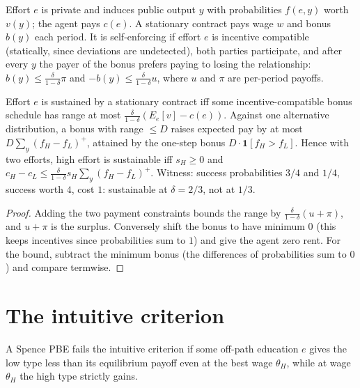\begin{definition}
\label{def:stat-contract}
\leanok
Effort $e$ is private and induces public output $y$ with probabilities $f(e, y)$ worth $v(y)$; the agent pays $c(e)$.
A stationary contract pays wage $w$ and bonus $b(y)$ each period. It is self-enforcing if effort $e$ is incentive
compatible (statically, since deviations are undetected), both parties participate, and after every $y$ the payer of
the bonus prefers paying to losing the relationship: $b(y) \le \frac{\delta}{1-\delta}\pi$ and
$-b(y) \le \frac{\delta}{1-\delta}u$, where $u$ and $\pi$ are per-period payoffs.
\end{definition}

\begin{theorem}
\label{thm:levin-mh}
\leanok
{}
Effort $e$ is sustained by a stationary contract iff some incentive-compatible bonus schedule has range at most
$\frac{\delta}{1-\delta}(E_e[v] - c(e))$. Against one alternative distribution, a bonus with range $\le D$ raises expected
pay by at most $D \sum_y (f_H - f_L)^+$, attained by the one-step bonus $D \cdot \mathbf 1[f_H > f_L]$. Hence with two
efforts, high effort is sustainable iff $s_H \ge 0$ and $c_H - c_L \le \frac{\delta}{1-\delta} s_H \sum_y (f_H - f_L)^+$.
Witness: success probabilities $3/4$ and $1/4$, success worth $4$, cost $1$: sustainable at $\delta = 2/3$, not at $1/3$.
\end{theorem}
\begin{proof}
\leanok
Adding the two payment constraints bounds the range by $\frac{\delta}{1-\delta}(u + \pi)$, and $u + \pi$ is the surplus.
Conversely shift the bonus to have minimum $0$ (this keeps incentives since probabilities sum to $1$) and give the
agent zero rent. For the bound, subtract the minimum bonus (the differences of probabilities sum to $0$) and compare
termwise.
\end{proof}

\section{The intuitive criterion}

\begin{definition}
\label{def:intuitive}
\leanok
{}
A Spence PBE fails the intuitive criterion if some off-path education $e$ gives the low type less than its equilibrium
payoff even at the best wage $\theta_H$, while at wage $\theta_H$ the high type strictly gains.
\end{definition}

